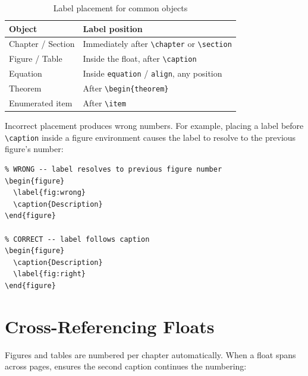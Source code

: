 \begin{table}[htbp]
  \centering
  \caption{Label placement for common objects}
  \label{tab:label-placement}
  \begin{tabular}{@{}lp{}@{}}
    \toprule
    \textbf{Object} & \textbf{Label position} \\
    \midrule
    Chapter / Section & Immediately after \verb|\chapter| or \verb|\section| \\
    Figure / Table    & Inside the float, after \verb|\caption| \\
    Equation          & Inside \verb|equation| / \verb|align|, any position \\
    Theorem           & After \verb|\begin{theorem}| \\
    Enumerated item   & After \verb|\item| \\
    \bottomrule
  \end{tabular}
\end{table}

Incorrect placement produces wrong numbers.  For example, placing a
label before \verb|\caption| inside a figure environment causes the
label to resolve to the previous figure's number:

\begin{verbatim}
% WRONG -- label resolves to previous figure number
\begin{figure}
  \label{fig:wrong}
  \caption{Description}
\end{figure}

% CORRECT -- label follows caption
\begin{figure}
  \caption{Description}
  \label{fig:right}
\end{figure}
\end{verbatim}

\section{Cross-Referencing Floats}

Figures and tables are numbered per chapter automatically.  When a float
spans across pages,  ensures the second caption
continues the numbering:

